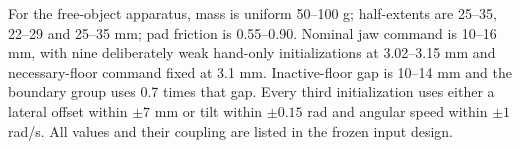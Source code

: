For the free-object apparatus, mass is uniform 50--100 g; half-extents are 25--35, 22--29 and 25--35 mm; pad friction is 0.55--0.90. Nominal jaw command is 10--16 mm, with nine deliberately weak hand-only initializations at 3.02--3.15 mm and necessary-floor command fixed at 3.1 mm. Inactive-floor gap is 10--14 mm and the boundary group uses 0.7 times that gap. Every third initialization uses either a lateral offset within $\pm7$ mm or tilt within $\pm0.15$ rad and angular speed within $\pm1$ rad/s. All values and their coupling are listed in the frozen input design.
